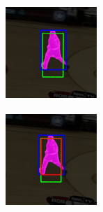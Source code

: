 \begin{figure}[t]
\begin{subfigure}[b]{0.135\textwidth}
        \caption[]{}
    \end{subfigure}
    \hfill
    \begin{subfigure}[b]{0.135\textwidth}
        \centering
        \includegraphics[width=\textwidth]{figures/theoretical_foundations/fast_vot_rot_bbox_algo_05.pdf}
        \caption[]{}
    \end{subfigure}
    \hfill
    \begin{subfigure}[b]{0.135\textwidth}
        \centering
        \includegraphics[width=\textwidth]{figures/theoretical_foundations/fast_vot_rot_bbox_algo_06.pdf}

\end{subfigure}
\end{figure}
